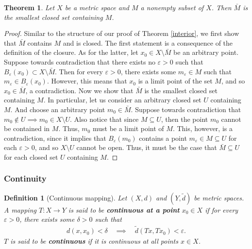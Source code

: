 \documentclass[11pt]{article}
\theoremstyle{mystyle}
\newtheorem{thm}{Theorem}[section]
\newtheorem{defn}{Definition}[section]
\begin{document}
\begin{thm}
Let $X$ be a metric space and $M$ a nonempty subset of $X$. Then $\bar{M}$ is the smallest closed set containing $M$.
\end{thm}
\begin{proof}
Similar to the structure of our proof of Theorem \ref{interior}, we first show that $\bar{M}$ contains $M$ and is closed. The first statement is a consequence of the definition of the closure. As for the latter, let $x_0 \in X \setminus \bar{M}$ be an arbitrary point. Suppose towards contradiction that there exists no $\varepsilon > 0$ such that $B_{\varepsilon}(x_0) \subset X \setminus \bar{M}$. Then for every $\varepsilon > 0$, there exists some $m_{\varepsilon} \in M$ such that $m_{\varepsilon} \in B_{\varepsilon}(x_0)$. However, this means that $x_0$ is a limit point of the set $M$, and so $x_0 \in \bar{M}$, a contradiction.\newline
Now we show that $\bar{M}$ is the smallest closed set containing $M$. In particular, let us consider an arbitrary closed set $U$ containing $M$. And choose an arbitrary point $m_0 \in \bar{M}$. Suppose towards contradiction that $m_0 \notin U \implies m_0 \in X \setminus U$. Also notice that since $M \subseteq U$, then the point $m_0$ cannot be contained in $M$. Thus, $m_0$ must be a limit point of $M$. This, however, is a contradiction, since it implies that $B_{\varepsilon}(m_0)$ contains a point $m_{\varepsilon} \in M \subseteq U$ for each $\varepsilon > 0$, and so $X \setminus U$ cannot be open. Thus, it must be the case that $\bar{M} \subseteq U$ for each closed set $U$ containing $M$.
\end{proof}

\subsubsection{Continuity}

\begin{defn}[Continuous mapping]
Let $(X, d)$ and $(Y, \tilde{d})$ be metric spaces. A mapping $T: X \longrightarrow Y$ is said to be \textbf{continuous at a point} $x_0 \in X$ if for every $\varepsilon > 0$, there exists some $\delta > 0$ such that
\begin{align*}
    d(x, x_0) < \delta \quad \implies \quad \tilde{d}(Tx, Tx_0) < \varepsilon.
\end{align*}
$T$ is said to be \textbf{continuous} if it is continuous at all points $x \in X$.
\end{defn}
\end{document}
